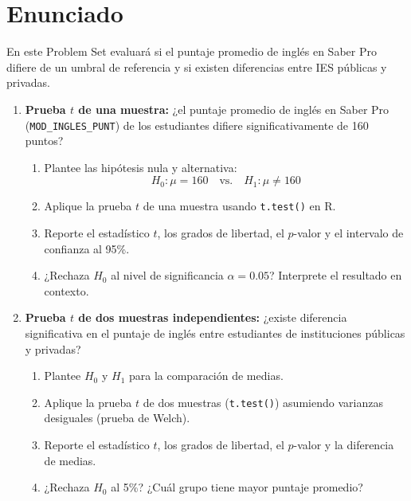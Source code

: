 \documentclass[11pt, a4paper]{article}
\begin{document}
\section*{Enunciado}

En este Problem Set evaluar\'a si el puntaje promedio de ingl\'es en Saber Pro
difiere de un umbral de referencia y si existen diferencias entre IES p\'ublicas
y privadas.

\begin{enumerate}[label=\arabic*)]
  \item \textbf{Prueba $t$ de una muestra:} ¿el puntaje promedio de ingl\'es
        en Saber Pro (\texttt{MOD\_INGLES\_PUNT}) de los estudiantes
        difiere significativamente de 160 puntos?
        \begin{enumerate}[label=\alph*)]
          \item Plantee las hip\'otesis nula y alternativa:
                \[
                  H_0: \mu = 160 \quad \text{vs.} \quad H_1: \mu \neq 160
                \]
          \item Aplique la prueba $t$ de una muestra usando \texttt{t.test()}
                en R.
          \item Reporte el estad\'istico $t$, los grados de libertad, el
                $p$-valor y el intervalo de confianza al 95\%.
          \item ¿Rechaza $H_0$ al nivel de significancia $\alpha = 0.05$?
                Interprete el resultado en contexto.
        \end{enumerate}

  \item \textbf{Prueba $t$ de dos muestras independientes:} ¿existe diferencia
        significativa en el puntaje de ingl\'es entre estudiantes de
        instituciones p\'ublicas y privadas?
        \begin{enumerate}[label=\alph*)]
          \item Plantee $H_0$ y $H_1$ para la comparaci\'on de medias.
          \item Aplique la prueba $t$ de dos muestras (\texttt{t.test()})
                asumiendo varianzas desiguales (prueba de Welch).
          \item Reporte el estad\'istico $t$, los grados de libertad, el
                $p$-valor y la diferencia de medias.
          \item ¿Rechaza $H_0$ al 5\%? ¿Cu\'al grupo tiene mayor puntaje
                promedio?
        \end{enumerate}


\end{enumerate}
\end{document}
